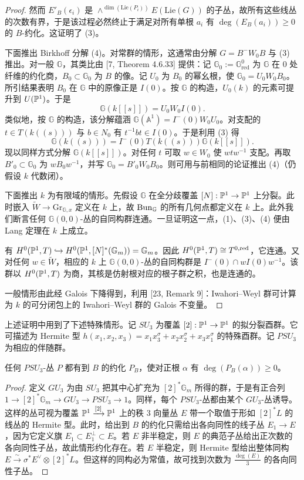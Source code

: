 \begin{proof}
然而 $E'_B(\epsilon_i)$ 是 $\wedge^{\dim(\mathrm{Lie}(P_i))}E(\mathrm{Lie}(G))$ 的子丛，故所有这些线丛的次数有界，于是该过程必然终止于满足对所有单根 $a_i$ 有 $\deg(E_B(a_i))\ge 0$ 的 $B$-约化。这证明了 (3)。

下面推出 Birkhoff 分解 (4)。对常群的情形，这通常由分解 $G=B^-W_0B$ 与 (3) 推出。对一般 $\mathbb G$，其类比由 [7, Theorem 4.6.33] 提供：记 $\mathbb G_0:=\mathbb G^0_{\mathrm{red}}$ 为 $\mathbb G$ 在 $0$ 处纤维的约化商，$B_0\subset\mathbb G_0$ 为 $B$ 的像。记 $U_0$ 为 $B_0$ 的幂幺根，使 $\mathbb G_0=U_0W_0B_0$。所引结果表明 $B_0$ 在 $\mathbb G$ 中的原像正是 $I(0)$。按 $\mathbb G$ 的构造，$U_0(k)$ 的元素可提升到 $U(\mathbb{P}^1)$。于是
\[
\mathbb G(k[[s]])=U_0W_0I(0).
\]
类似地，按 $\mathbb G$ 的构造，该分解蕴涵 $\mathbb G(\mathbb{A}^1)=I^-(0)W_0U_0$。对支配的 $t\in T(k((s)))$ 与 $b\in N_0$ 有 $t^{-1}bt\in I(0)$。于是利用 (3) 得
\[
\mathbb G(k((s)))=I^-(0)T(k((s)))\mathbb G(k[[s]]).
\]
现以同样方式分解 $\mathbb G(k[[s]])$。对任何 $t$ 可取 $w\in W_0$ 使 $wtw^{-1}$ 支配。再取 $B'_0\subset\mathbb G_0$ 为 $wB_0w^{-1}$，并写 $\mathbb G_0=B'_0W_0B_0$。则可用与前相同的论证推出 (4)（仍假设 $k$ 代数闭）。

下面推出 $k$ 为有限域的情形。先假设 $\mathbb G$ 在全分歧覆盖 $[N]:\mathbb{P}^1\to\mathbb{P}^1$ 上分裂。此时嵌入 $\widetilde W\to\mathrm{Gr}_{\mathbb G,x}$ 定义在 $k$ 上，故 $\mathrm{Bun}_{\mathbb G}$ 的所有几何点都定义在 $k$ 上。此外我们断言任何 $\mathbb G(0,0)$-丛的自同构群连通。一旦证明这一点，(1)、(3)、(4) 便由 Lang 定理在 $k$ 上成立。

有 $H^0(\mathbb{P}^1,T)\hookrightarrow H^0(\mathbb{P}^1,[N]^*(\mathbb{G}_m))=\mathbb{G}_m$。因此 $H^0(\mathbb{P}^1,T)\cong T^{0,\mathrm{red}}$，它连通。又对任何 $w\in\widetilde W$，相应的 $k$ 上 $\mathbb G(0,0)$-丛的自同构群是 $I^-(0)\cap wI(0)w^{-1}$。该群以 $H^0(\mathbb{P}^1,T)$ 为商，其核是仿射根对应的根子群之积，也是连通的。

一般情形由此经 Galois 下降得到，利用 [23, Remark 9]：Iwahori--Weyl 群可计算为 $k$ 的可分闭包上的 Iwahori--Weyl 群的 Galois 不变量。
\end{proof}

上述证明中用到了下述特殊情形。记 $SU_3$ 为覆盖 $[2]:\mathbb{P}^1\to\mathbb{P}^1$ 的拟分裂酉群。它可描述为 Hermite 型 $h(x_1,x_2,x_3)=x_1x_3^\sigma+x_2x_2^\sigma+x_3x_1^\sigma$ 的特殊酉群。记 $PSU_3$ 为相应的伴随群。

\begin{lemma}
任何 $PSU_3$-丛 $P$ 都有到 $B$ 的约化 $P_B$，使对正根 $\alpha$ 有 $\deg(P_B(\alpha))\ge 0$。
\end{lemma}

\begin{proof}
定义 $GU_3$ 为由 $SU_3$ 把其中心扩充为 $[2]^*\mathbb{G}_m$ 所得的群，于是有正合列 $1\to[2]^*\mathbb{G}_m\to GU_3\to PSU_3\to1$。同样，每个 $PSU_3$-丛都由某个 $GU_3$-丛诱导。这样的丛可视为覆盖 $\mathbb{P}^1\xrightarrow{[2]}\mathbb{P}^1$ 上的秩 $3$ 向量丛 $E$ 带一个取值于形如 $[2]^*L$ 的线丛的 Hermite 型。此时，给出到 $B$ 的约化只需给出各向同性的线子丛 $E_1\to E$，因为它定义旗 $E_1\subset E_1^\perp\subset E$。若 $E$ 非半稳定，则 $E$ 的典范子丛给出正次数的各向同性子丛，故此情形约化存在。若 $E$ 半稳定，则 Hermite 型给出整体同构 $E\xrightarrow{\sim}\sigma^*E^\vee\otimes[2]^*L$。但这样的同构必为常值，故可找到次数为 $\frac{\deg(E)}{3}$ 的各向同性子丛。
\end{proof}
